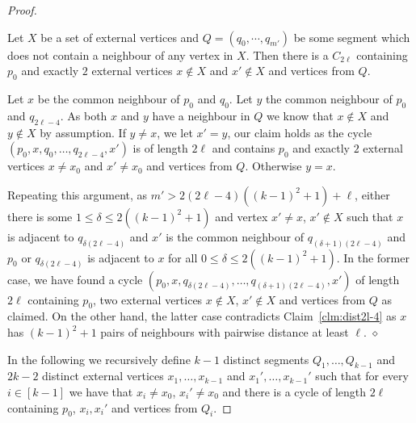 \documentclass[10pt,a4paper]{amsart}
\newenvironment{claimproof}
{\noindent {\em Proof of Claim:} }
{\hfill $\diamond$ \smallskip}
\begin{document}
\begin{proof}
    \begin{mclaim}\label{clm-seg}
        Let $X$ be a set of external vertices and $Q = (q_0, \cdots, q_{m'})$ be some segment which does not contain a neighbour of any vertex in $X$. Then there is a $C_{2\ell}$ containing $p_0$ and exactly $2$ external vertices $ x\notin X$ and $x' \notin X$ and vertices from $Q$.
    \end{mclaim}
    \begin{claimproof}
        Let $x$ be the common neighbour of $p_0$ and $q_0$. Let $y$ the common neighbour of $p_0$ and $q_{2\ell-4}$. As both $x$ and $y$ have a neighbour in $Q$ we know that $x\notin X$ and $y\notin X$ by assumption. If $y \neq x$, we let $x'=y$, our claim holds as the cycle $(p_0,x,q_0, \dots, q_{2\ell-4},x')$ is of length $2\ell$ and contains $p_0$ and exactly $2$ external vertices $ x\neq x_0$ and $x' \neq x_0$ and vertices from $Q$. Otherwise $y = x$.

        
        Repeating this argument, as $m' > 2(2\ell-4)((k-1)^2+1)+\ell$, either there is some $1 \leq \delta \leq 2((k-1)^2+1)$ and vertex $x' \neq x$, $x' \notin  X$ such that $x$ is adjacent to $q_{\delta(2\ell-4)}$ and $x'$ is the common neighbour of $q_{(\delta+1)(2\ell-4)}$ and $p_0$ or $q_{\delta(2\ell-4)}$ is adjacent to $x$ for all $0 \leq \delta \leq 2((k-1)^2+1)$. In the former case, we have found a cycle $(p_0, x, q_{\delta(2\ell-4)}, \dots, q_{(\delta+1)(2\ell-4)}, x')$ of length $2\ell$ containing $p_0$, two external vertices $x\notin X$, $x'\notin X$ and vertices from $Q$ as claimed.  On the other hand, the latter case contradicts Claim~\ref{clm:dist2l-4} as $x$ has $(k-1)^2+1$ pairs of neighbours with pairwise distance at least $\ell$. 
    \end{claimproof}

    In the following we recursively define $k-1$ distinct segments $Q_1,\dots, Q_{k-1}$ and $2k-2$ distinct external vertices $x_1, \dots, x_{k-1}$ and $x_1',\dots, x_{k-1}'$  such that for every $i\in [k-1]$ we have that $x_i\neq x_0$, $x_i'\neq x_0$ and there is a cycle of length $2\ell$ containing $p_0$, $x_i, x_i'$ and vertices from $Q_i$.


\end{proof}
\end{document}
